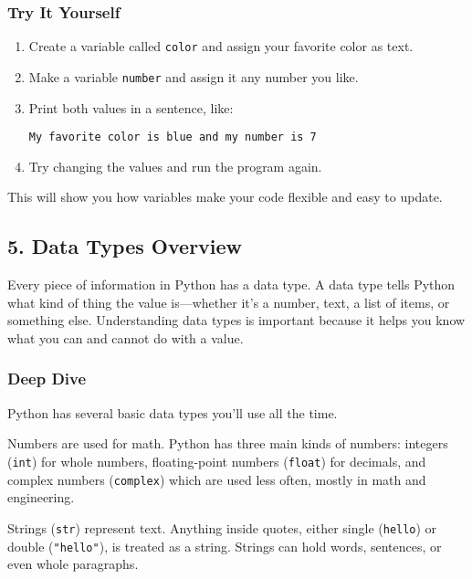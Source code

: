 \documentclass[
  letterpaper,
  DIV=11,
  numbers=noendperiod]{scrreprt}
\begin{document}
\subsubsection{Try It Yourself}\label{try-it-yourself-4}

\begin{enumerate}
\def\labelenumi{\arabic{enumi}.}
\item
  Create a variable called \texttt{color} and assign your favorite color
  as text.
\item
  Make a variable \texttt{number} and assign it any number you like.
\item
  Print both values in a sentence, like:

\begin{verbatim}
My favorite color is blue and my number is 7
\end{verbatim}
\item
  Try changing the values and run the program again.
\end{enumerate}

This will show you how variables make your code flexible and easy to
update.

\subsection{5. Data Types Overview}\label{data-types-overview}

Every piece of information in Python has a data type. A data type tells
Python what kind of thing the value is---whether it's a number, text, a
list of items, or something else. Understanding data types is important
because it helps you know what you can and cannot do with a value.

\subsubsection{Deep Dive}\label{deep-dive-5}

Python has several basic data types you'll use all the time.

Numbers are used for math. Python has three main kinds of numbers:
integers (\texttt{int}) for whole numbers, floating-point numbers
(\texttt{float}) for decimals, and complex numbers (\texttt{complex})
which are used less often, mostly in math and engineering.

Strings (\texttt{str}) represent text. Anything inside quotes, either
single (\texttt{\textquotesingle{}hello\textquotesingle{}}) or double
(\texttt{"hello"}), is treated as a string. Strings can hold words,
sentences, or even whole paragraphs.
\end{document}
